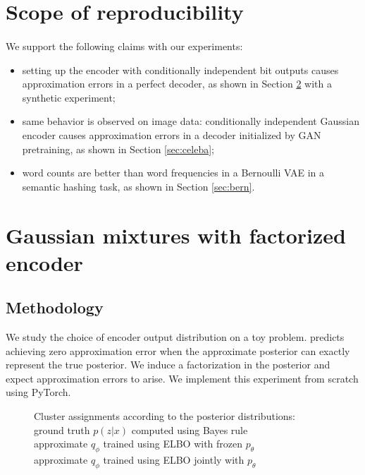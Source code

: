 \section{Scope of reproducibility}
\label{sec:claims}

\paragraph{}
%
We support the following claims with our experiments:

\begin{itemize}
    \item setting up the encoder with conditionally independent bit outputs causes approximation errors in a perfect decoder, as shown in Section \ref{sec:gmm} with a synthetic experiment;
    \item same behavior is observed on image data: conditionally independent Gaussian encoder causes approximation errors in a decoder initialized by GAN pretraining, as shown in Section \ref{sec:celeba};
    \item word counts are better than word frequencies in a Bernoulli VAE in a semantic hashing task, as shown in Section \ref{sec:bern}.
\end{itemize}

\section{Gaussian mixtures with factorized encoder}\label{sec:gmm}

\subsection{Methodology}

We study the choice of encoder output distribution on a toy problem. \cite{shekhovtsov2022vae} predicts achieving zero approximation error when the approximate posterior can exactly represent the true posterior. We induce a factorization in the posterior and expect approximation errors to arise.  We implement this experiment from scratch using PyTorch.


\begin{figure}
    \centering
    \caption{Cluster assignments according to the posterior distributions:
    \\  ground truth $p(z|x)$ computed using Bayes rule 
    \\  approximate $q_\phi$ trained using ELBO with frozen $p_\theta$ \\
     approximate $q_\phi$ trained using ELBO jointly with $p_\theta$}
    \label{fig:fac}
\end{figure}

